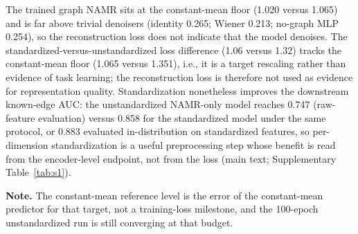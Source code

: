 \documentclass[11pt,a4paper]{article}
\newcommand{\supptab}[1]{Supplementary Table~\ref{#1}}
\begin{document}
\begin{table}[h]
\noindent The trained graph NAMR sits at the constant-mean floor (1.020 versus 1.065) and is far above trivial
denoisers (identity 0.265; Wiener 0.213; no-graph MLP 0.254), so the reconstruction loss does not indicate that the
model denoises. The standardized-versus-unstandardized loss difference (1.06 versus 1.32) tracks the constant-mean
floor (1.065 versus 1.351), i.e., it is a target rescaling rather than evidence of task learning; the reconstruction
loss is therefore not used as evidence for representation quality. Standardization nonetheless improves the
downstream known-edge AUC: the unstandardized NAMR-only model reaches 0.747 (raw-feature evaluation) versus 0.858 for
the standardized model under the same protocol, or 0.883 evaluated in-distribution on standardized features, so
per-dimension standardization is a useful preprocessing step whose benefit is read from the encoder-level endpoint,
not from the loss (main text; \supptab{tab:s1}).
\end{table}

\begin{table}[H]
\centering
\caption{\textbf{NAMR convergence and the skip-connection diagnostic.} Loss at epoch 1 and final epoch (500 epochs unless noted). Plain decoder: the method used throughout this study. Skip-connected decoder: a diagnostic variant whose decoder input concatenates the noisy feature $[\mathbf{h}_i; \tilde{\mathbf{x}}_i]$; it reaches a much lower loss but yields worse cosine separation (NAMR-only skip-connected: known-edge AUC 0.601, below the random-init HGT at 0.6625), so it is not used.}
\label{tab:s2}
\footnotesize
{}

\smallskip
{\footnotesize \noindent \textbf{Note.} The constant-mean reference level is the error of the constant-mean predictor for that target, not a training-loss milestone, and the 100-epoch unstandardized run is still converging at that budget.}
\end{table}
\end{document}

